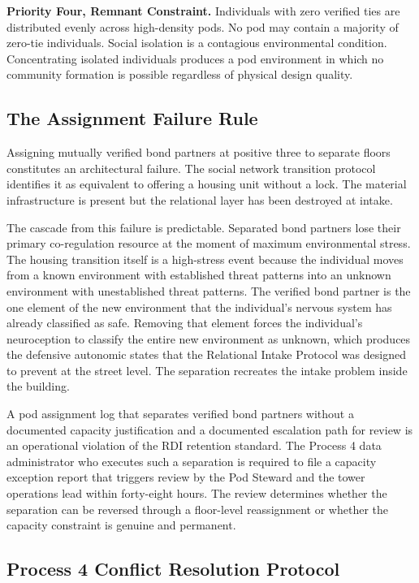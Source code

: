 \documentclass[12pt, letterpaper]{article}
\begin{document}
\textbf{Priority Four, Remnant Constraint.} Individuals with zero verified ties are distributed evenly across high-density pods. No pod may contain a majority of zero-tie individuals. Social isolation is a contagious environmental condition. Concentrating isolated individuals produces a pod environment in which no community formation is possible regardless of physical design quality.

\subsection{The Assignment Failure Rule}

Assigning mutually verified bond partners at positive three to separate floors constitutes an architectural failure. The social network transition protocol identifies it as equivalent to offering a housing unit without a lock. The material infrastructure is present but the relational layer has been destroyed at intake.

The cascade from this failure is predictable. Separated bond partners lose their primary co-regulation resource at the moment of maximum environmental stress. The housing transition itself is a high-stress event because the individual moves from a known environment with established threat patterns into an unknown environment with unestablished threat patterns. The verified bond partner is the one element of the new environment that the individual's nervous system has already classified as safe. Removing that element forces the individual's neuroception to classify the entire new environment as unknown, which produces the defensive autonomic states that the Relational Intake Protocol was designed to prevent at the street level. The separation recreates the intake problem inside the building.

A pod assignment log that separates verified bond partners without a documented capacity justification and a documented escalation path for review is an operational violation of the RDI retention standard. The Process 4 data administrator who executes such a separation is required to file a capacity exception report that triggers review by the Pod Steward and the tower operations lead within forty-eight hours. The review determines whether the separation can be reversed through a floor-level reassignment or whether the capacity constraint is genuine and permanent.

\subsection{Process 4 Conflict Resolution Protocol}
\end{document}
